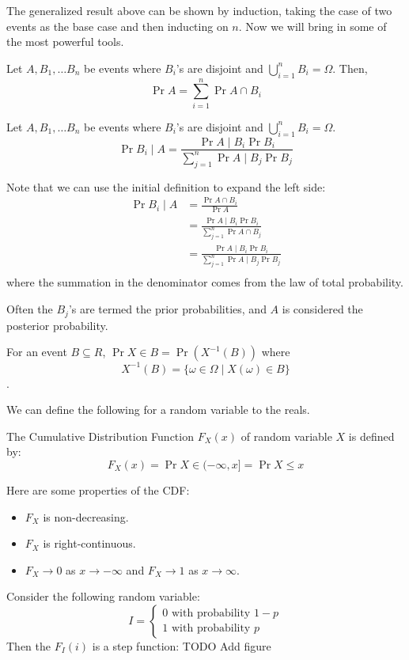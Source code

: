The generalized result above can be shown by induction, taking the case of two events as the base case and then inducting on $n$.
Now we will bring in some of the most powerful tools.

\begin{theorem}
    Let $A, B_1, \dots B_n$ be events where $B_i$'s are disjoint and $\bigcup_{i=1}^n B_i = \Omega$.
    Then,
    \[ \Pr{A} = \sum_{i = 1}^n \Pr{A \cap B_i} \]
\end{theorem}

\begin{theorem} 
    Let $A, B_1, \dots B_n$ be events where $B_i$'s are disjoint and $\bigcup_{i=1}^n B_i = \Omega$.
    \[ \Pr{B_i \mid A} = \frac{\Pr{A \mid B_i} \Pr{B_i}}{\sum_{j = 1}^n \Pr{A \mid B_j}\Pr{B_j}} \]

    \begin{proof*}
        Note that we can use the initial definition to expand the left side:
        \begin{align*}
            \Pr{B_i \mid A} &= \frac{\Pr{A \cap B_i}}{\Pr{A}} \\
            &= \frac{\Pr{A \mid B_i} \Pr{B_i}}{\sum_{j = 1}^n \Pr{A \cap B_j}} \\
            &= \frac{\Pr{A \mid B_i} \Pr{B_i}}{\sum_{j = 1}^n \Pr{A \mid B_j} \Pr{B_j}} \\
        \end{align*}
        where the summation in the denominator comes from the law of total probability.
    \end{proof*}
\end{theorem}

Often the $B_j$'s are termed the prior probabilities, and $A$ is considered the posterior probability.

For an event $B \subseteq R$, $\Pr{X \in B} = \Pr{(X^{-1}(B))}$ where
\[ X^{-1}(B) = \{ \omega \in \Omega \mid X(\omega) \in B \} \].

We can define the following for a random variable to the reals.
\begin{definition} 
    The Cumulative Distribution Function $F_X(x)$ of random variable $X$ is defined by:
    \[ F_X(x) = \Pr{X \in (- \infty, x]} = \Pr{X \leq x} \]
\end{definition}

Here are some properties of the CDF:
\begin{itemize}
    \item $F_X$ is non-decreasing.
    \item $F_X$ is right-continuous.
    \item $F_X \to 0$ as $x \to -\infty$ and $F_X \to 1$ as $x \to \infty$.
\end{itemize}

\begin{example} 
    Consider the following random variable:
    \[ I = \begin{cases}
        0 \text{ with probability $1-p$} \\
        1 \text{ with probability $p$}
    \end{cases} \]
    Then the $F_I(i)$ is a step function:
    TODO Add figure
\end{example}